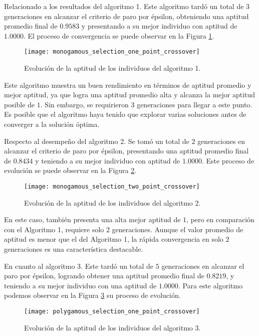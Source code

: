 Relacionado a los resultados del algoritmo 1. Este algoritmo tardó un total de $3$ generaciones en alcanzar el criterio de paro por épsilon, obteniendo una aptitud promedio final de $0.9583$ y presentando a su mejor individuo con aptitud de $1.0000$. El proceso de convergencia se puede observar en la Figura \ref{fig: m_op}.

\begin{figure}[htbp]
	\centering
	\texttt{[image: monogamous\_selection\_one\_point\_crossover]}
	\caption{Evolución de la aptitud de los individuos del algoritmo 1.}
	\label{fig: m_op}
\end{figure}

Este algoritmo muestra un buen rendimiento en términos de aptitud promedio y mejor aptitud, ya que logra una aptitud promedio alta y alcanza la mejor aptitud posible de $1$. Sin embargo, se requirieron 3 generaciones para llegar a este punto. Es posible que el algoritmo haya tenido que explorar varias soluciones antes de converger a la solución óptima.

Respecto al desempeño del algoritmo 2. Se tomó un total de $2$ generaciones en alcanzar el criterio de paro por épsilon, presentando una aptitud promedio final de $0.8434$ y teniendo a su mejor individuo con aptitud de $1.0000$. Este proceso de evolución se puede observar en la Figura \ref{fig: m_tp}.

\begin{figure}[htbp]
	\centering
	\texttt{[image: monogamous\_selection\_two\_point\_crossover]}
	\caption{Evolución de la aptitud de los individuos del algoritmo 2.}
	\label{fig: m_tp}
\end{figure}

En este caso, también presenta una alta mejor aptitud de $1$, pero en comparación con el Algoritmo 1, requiere solo $2$ generaciones. Aunque el valor promedio de aptitud es menor que el del Algoritmo 1, la rápida convergencia en solo $2$ generaciones es una característica destacable.

En cuanto al algoritmo 3. Este tardó un total de $5$ generaciones en alcanzar el paro por épsilon, logrando obtener una aptitud promedio final de $0.8219$, y teniendo a su mejor individuo con una aptitud de $1.0000$. Para este algoritmo podemos observar en la Figura \ref{fig: p_op} su proceso de evolución.

\begin{figure}[htbp]
	\centering
	\texttt{[image: polygamous\_selection\_one\_point\_crossover]}
	\caption{Evolución de la aptitud de los individuos del algoritmo 3.}
	\label{fig: p_op}
\end{figure}

